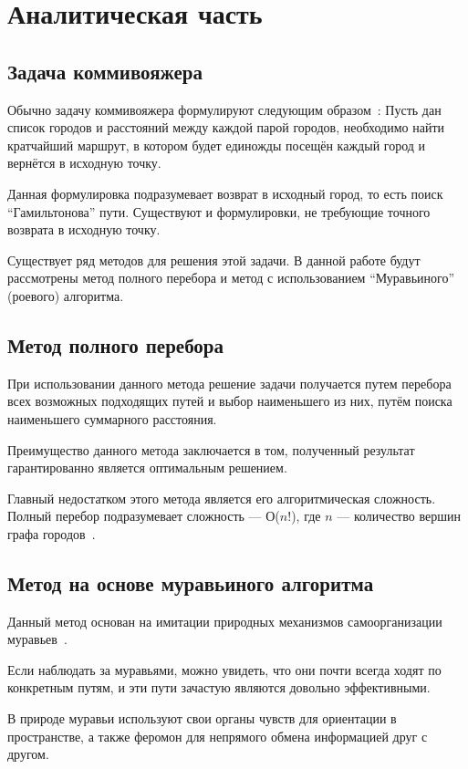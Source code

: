 \section{Аналитическая часть}

\subsection{Задача коммивояжера}

Обычно задачу коммивояжера формулируют следующим образом~\cite{applegate2011traveling}: Пусть дан список городов и расстояний между каждой парой городов, необходимо найти кратчайший маршрут, в котором будет единожды посещён каждый город и вернётся в исходную точку.

Данная формулировка подразумевает возврат в исходный город, то есть поиск ``Гамильтонова'' пути. Существуют и формулировки, не требующие точного возврата в исходную точку.

Существует ряд методов для решения этой задачи. В данной работе будут рассмотрены метод полного перебора и метод с использованием ``Муравьиного'' (роевого) алгоритма.

\subsection{Метод полного перебора}

При использовании данного метода решение задачи получается путем перебора всех возможных подходящих путей и выбор наименьшего из них, путём поиска наименьшего суммарного расстояния.

Преимущество данного метода заключается в том, полученный результат гарантированно является оптимальным решением.

Главный недостатком этого метода является его алгоритмическая сложность. Полный перебор подразумевает сложность --- О($n!$), где $n$ --- количество вершин графа городов~\cite{ylanov}.

\subsection{Метод на основе муравьиного алгоритма}
Данный метод основан на имитации природных механизмов самоорганизации муравьев~\cite{antAlgs}.

Если наблюдать за муравьями, можно увидеть, что они почти всегда ходят по конкретным путям, и эти пути зачастую являются довольно эффективными.

В природе муравьи используют свои органы чувств для ориентации в пространстве, а также феромон для непрямого обмена информацией друг с другом.

